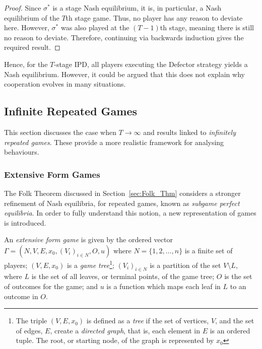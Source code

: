 \begin{proof}
    Since \( \sigma^{*} \) is a stage Nash equilibrium, it is, in particular,
    a Nash equilibrium of the \(T\)th stage game. Thus, no player has any reason
    to deviate here. However, \( \sigma^{*} \) was also played at the
    \((T-1)\)th stage, meaning there is still no reason to deviate.
    Therefore, continuing via backwards induction gives the required result.
\end{proof}

Hence, for the \(T\)-stage IPD, all players executing the Defector strategy
yields a Nash equilibrium. However, it could be argued that this does not
explain why cooperation evolves in many situations.

\subsection{Infinite Repeated Games}\label{subsec:Infinite_Repeated_Games}
This section discusses the case when \(T \to \infty \) and results linked to
\textit{infinitely repeated games}. These provide a more realistic framework for
analysing behaviours. 

\newpage
\subsubsection{Extensive Form Games}\label{subsubsec:Extensive_Form_Games}
The Folk Theorem discussed in Section~\ref{sec:Folk_Thm}
considers a stronger refinement of Nash equilibria, for repeated games, known as
\textit{subgame perfect equilibria}. In order to fully understand this notion, a
new representation of games is introduced.

\begin{definition}
   An \textit{extensive form game} is given by the ordered vector
\(\Gamma = (N, V, E, x_{0}, {(V_{i})}_{i \in N}, O, u)\)
where \(N=\{1, 2, \ldots, n\} \) is a finite set of players; \((V, E, x_{0})\)
is a \textit{game tree}\footnote{The triple \((V, E, x_{0})\) is defined as a
\textit{tree} if the set of vertices, \(V\), and the set of edges, \(E\), create
a \textit{directed graph}, that is, each element in \(E\) is an ordered tuple.
The root, or starting node, of the graph is represented by \(x_{0}\)};
\({(V_{i})}_{i \in N}\) is a partition of the set \(V \setminus L\), where \(L\)
is the set of all
leaves, or terminal points, of the game tree; \(O\) is the set of outcomes for
the game; and \(u\) is a function which maps each leaf in \(L\) to an outcome 
in \(O\). 
\end{definition}

